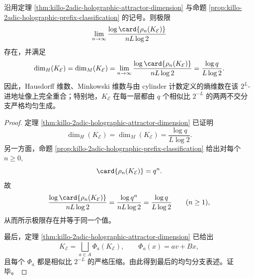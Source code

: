 \begin{theorem}\label{thm:killo-2adic-holographic-cylinder-entropy-dimension}
沿用定理 \ref{thm:killo-2adic-holographic-attractor-dimension} 与命题 \ref{prop:killo-2adic-holographic-prefix-classification} 的记号。则极限
\[
\lim_{n\to\infty}\frac{\log \card{\rho_n(K_{\mathcal E})}}{nL\log 2}
\]
存在，并满足
\[
\dim_H(K_{\mathcal E})
=
\dim_M(K_{\mathcal E})
=
\lim_{n\to\infty}\frac{\log \card{\rho_n(K_{\mathcal E})}}{nL\log 2}
=
\frac{\log q}{L\log 2}.
\]
因此，Hausdorff 维数、Minkowski 维数与由 cylinder 计数定义的熵维数在该 \(2^L\)-进地址像上完全重合；特别地，\(K_{\mathcal E}\) 在每一层都由 \(q\) 个相似比 \(2^{-L}\) 的两两不交分支严格均匀生成。
\end{theorem}
\begin{proof}
定理 \ref{thm:killo-2adic-holographic-attractor-dimension} 已证明
\[
\dim_H(K_{\mathcal E})=\dim_M(K_{\mathcal E})=\frac{\log q}{L\log 2}.
\]
另一方面，命题 \ref{prop:killo-2adic-holographic-prefix-classification} 给出对每个 \(n\ge 0\),
\[
\card{\rho_n(K_{\mathcal E})}=q^n.
\]
故
\[
\frac{\log \card{\rho_n(K_{\mathcal E})}}{nL\log 2}
=
\frac{\log q^n}{nL\log 2}
=
\frac{\log q}{L\log 2}
\qquad(n\ge 1),
\]
从而所示极限存在并等于同一个值。

最后，定理 \ref{thm:killo-2adic-holographic-attractor-dimension} 已给出
\[
K_{\mathcal E}=\bigsqcup_{a\in A}\Phi_a(K_{\mathcal E}),
\qquad
\Phi_a(x)=av+Bx,
\]
且每个 \(\Phi_a\) 都是相似比 \(2^{-L}\) 的严格压缩。由此得到最后的均匀分支表述。证毕。
\end{proof}

